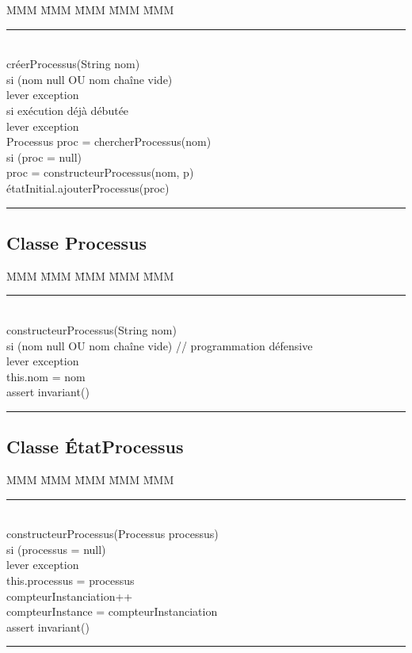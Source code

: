\documentclass[11pt,article]{article}
\begin{document}
\begin{tabbing}
MMM \= MMM \= MMM \= MMM \= MMM \kill
\rule{12cm}{0.2mm} \\
\textsf{\large créerProcessus(String nom)} \\
\> si (nom null OU nom chaîne vide)\\
\> \> lever exception\\
\> si exécution déjà débutée \\
\> \> lever exception \\
\> Processus proc = chercherProcessus(nom)\\
\> si (proc = null) \\
\> \> proc = constructeurProcessus(nom, p)\\
\> \> étatInitial.ajouterProcessus(proc)\\
\rule{12cm}{0.2mm}
\end{tabbing}

\newpage

\subsection{Classe \textsf{Processus}}

\begin{tabbing}
MMM \= MMM \= MMM \= MMM \= MMM \kill
\rule{12cm}{0.2mm} \\
\textsf{\large constructeurProcessus(String nom)} \\
\> si (nom null OU nom chaîne vide) // programmation défensive\\
\> \> lever exception\\
\> this.nom = nom\\
\> assert invariant()\\
\rule{12cm}{0.2mm}
\end{tabbing}

\subsection{Classe \textsf{ÉtatProcessus}}

\begin{tabbing}
MMM \= MMM \= MMM \= MMM \= MMM \kill
\rule{12cm}{0.2mm} \\
\textsf{\large constructeurProcessus(Processus processus)} \\
\> si (processus = null)\\
\> \> lever exception\\
\> this.processus = processus\\
\> compteurInstanciation++\\
\> compteurInstance = compteurInstanciation\\
\> assert invariant()\\
\rule{12cm}{0.2mm}
\end{tabbing}
\end{document}
